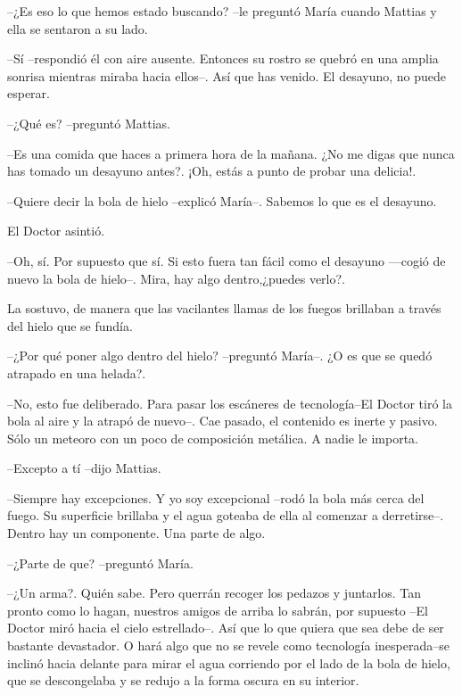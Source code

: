 --¿Es eso lo que hemos estado buscando? --le preguntó María cuando Mattias y ella se sentaron a su lado.



--Sí --respondió él con aire ausente. Entonces su rostro se quebró en una amplia sonrisa mientras miraba hacia ellos--. Así que has venido. El desayuno, no puede esperar.



--¿Qué es? --preguntó Mattias.



--Es una comida que haces a primera hora de la mañana. ¿No me digas que nunca has tomado un desayuno antes?. ¡Oh, estás a punto de probar una delicia!.



--Quiere decir la bola de hielo --explicó María--. Sabemos lo que es el desayuno. 


El Doctor asintió. 


--Oh, sí. Por supuesto que sí. Si esto fuera tan fácil como el desayuno ---cogió de nuevo la bola de hielo--. Mira, hay algo dentro,¿puedes verlo?.



La sostuvo, de manera que las vacilantes llamas de los fuegos brillaban a través del hielo que se fundía.



--¿Por qué poner algo dentro del hielo? --preguntó  María--. ¿O es que se quedó atrapado en una helada?.



--No, esto fue deliberado. Para pasar los escáneres de tecnología--El Doctor tiró la bola al aire y la atrapó de nuevo--. Cae pasado, el contenido es inerte y pasivo. Sólo un meteoro con un poco de composición metálica. A nadie le importa. 



--Excepto a tí --dijo Mattias.



--Siempre hay excepciones. Y yo soy excepcional --rodó la bola más cerca del fuego. Su superficie brillaba y el agua goteaba de ella al comenzar a derretirse--. Dentro hay un componente. Una parte de algo.



--¿Parte de que? --preguntó María.



--¿Un arma?. Quién sabe. Pero querrán recoger los pedazos y juntarlos. Tan pronto como lo hagan, nuestros amigos de arriba lo sabrán, por supuesto --El Doctor miró hacia el cielo estrellado--. Así que lo que quiera que sea debe de ser bastante devastador. O hará algo que no se revele como tecnología inesperada--se inclinó hacia delante para mirar el agua corriendo por el lado de la bola de hielo, que se descongelaba y se redujo a la forma oscura en su interior. 


